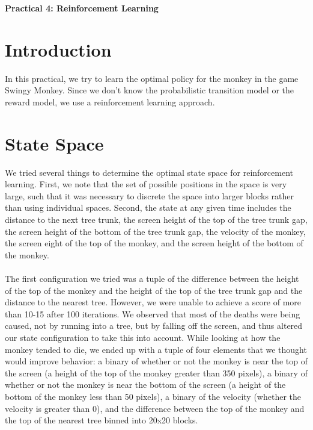 \documentclass[10pt, oneside]{article}
\begin{document}
\centerline{\Large{\textbf{Practical 4: Reinforcement Learning}}}
\vspace{6px}
\section{Introduction}
In this practical, we try to learn the optimal policy for the monkey in the game Swingy Monkey. Since we don't know the probabilistic transition model or the reward model, we use a reinforcement learning approach. 
\section{State Space}
We tried several things to determine the optimal state space for reinforcement learning. First, we note that the set of possible positions in the space is very large, such that it was necessary to discrete the space into larger blocks rather than using individual spaces. Second, the state at any given time includes the distance to the next tree trunk, the screen height of the top of the tree trunk gap, the screen height of the bottom of the tree trunk gap, the velocity of the monkey, the screen eight of the top of the monkey, and the screen height of the bottom of the monkey. \\\\
The first configuration we tried was a tuple of the difference between the height of the top of the monkey and the height of the top of the tree trunk gap and the distance to the nearest tree. However, we were unable to achieve a score of more than 10-15 after 100 iterations. We observed that most of the deaths were being caused, not by running into a tree, but by falling off the screen, and thus altered our state configuration to take this into account. While looking at how the monkey tended to die, we ended up with a tuple of four elements that we thought would improve behavior: a binary of whether or not the monkey is near the top of the screen (a height of the top of the monkey greater than 350 pixels), a binary of whether or not the monkey is near the bottom of the screen (a height of the bottom of the monkey less than 50 pixels), a binary of the velocity (whether the velocity is greater than 0), and the difference between the top of the monkey and the top of the nearest tree binned into 20x20 blocks.
\end{document}
